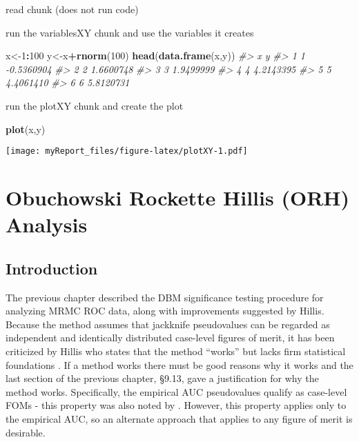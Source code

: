 \documentclass[
]{book}
\newenvironment{Shaded}{\begin{snugshade}}{\end{snugshade}}
\newcommand{\CommentTok}[1]{\textcolor[rgb]{0.56,0.35,0.01}{\textit{#1}}}
\newcommand{\DecValTok}[1]{\textcolor[rgb]{0.00,0.00,0.81}{#1}}
\newcommand{\KeywordTok}[1]{\textcolor[rgb]{0.13,0.29,0.53}{\textbf{#1}}}
\newcommand{\NormalTok}[1]{#1}
\newcommand{\OperatorTok}[1]{\textcolor[rgb]{0.81,0.36,0.00}{\textbf{#1}}}
\begin{document}
read chunk (does not run code)

run the variablesXY chunk and use the variables it creates

\begin{Shaded}
\begin{Highlighting}[]
\NormalTok{x\textless{}{-}}\DecValTok{1}\OperatorTok{:}\DecValTok{100}
\NormalTok{y\textless{}{-}x}\OperatorTok{+}\KeywordTok{rnorm}\NormalTok{(}\DecValTok{100}\NormalTok{)}
\KeywordTok{head}\NormalTok{(}\KeywordTok{data.frame}\NormalTok{(x,y))}
\CommentTok{\#\textgreater{}   x          y}
\CommentTok{\#\textgreater{} 1 1 {-}0.5360904}
\CommentTok{\#\textgreater{} 2 2  1.6600748}
\CommentTok{\#\textgreater{} 3 3  1.9499999}
\CommentTok{\#\textgreater{} 4 4  4.2143395}
\CommentTok{\#\textgreater{} 5 5  4.4061410}
\CommentTok{\#\textgreater{} 6 6  5.8120731}
\end{Highlighting}
\end{Shaded}

run the plotXY chunk and create the plot

\begin{Shaded}
\begin{Highlighting}[]
\KeywordTok{plot}\NormalTok{(x,y)}
\end{Highlighting}
\end{Shaded}

\texttt{[image: myReport\_files/figure-latex/plotXY-1.pdf]}

\hypertarget{ORHAnalysis}{%
\chapter{Obuchowski Rockette Hillis (ORH) Analysis}\label{ORHAnalysis}}

\hypertarget{introduction}{%
\section{Introduction}\label{introduction}}

The previous chapter described the DBM significance testing procedure \citep{RN204} for analyzing MRMC ROC data, along with improvements suggested by Hillis. Because the method assumes that jackknife pseudovalues can be regarded as independent and identically distributed case-level figures of merit, it has been criticized by Hillis who states that the method ``works'' but lacks firm statistical foundations \citep{RN1772, RN1865, RN1866}. If a method works there must be good reasons why it works and the last section of the previous chapter, §9.13, gave a justification for why the method works. Specifically, the empirical AUC pseudovalues qualify as case-level FOMs - this property was also noted by \citep{RN1395}. However, this property applies only to the empirical AUC, so an alternate approach that applies to any figure of merit is desirable.
\end{document}

